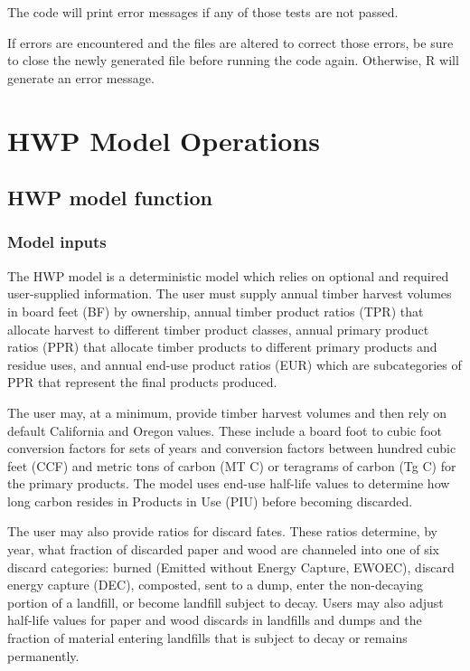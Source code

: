 \documentclass[
  openany]{book}
\begin{document}
The code will print error messages if any of those tests are not passed.

If errors are encountered and the files are altered to correct those
errors, be sure to close the newly generated file before running the
code again. Otherwise, R will generate an error message.

\hypertarget{model}{%
\chapter{HWP Model Operations}\label{model}}

\hypertarget{model-func}{%
\section{HWP model function}\label{model-func}}

\hypertarget{model-func-inp}{%
\subsection{Model inputs}\label{model-func-inp}}

The HWP model is a deterministic model which relies on optional and
required user-supplied information. The user must supply annual timber
harvest volumes in board feet (BF) by ownership, annual timber product
ratios (TPR) that allocate harvest to different timber product classes,
annual primary product ratios (PPR) that allocate timber products to
different primary products and residue uses, and annual end-use product
ratios (EUR) which are subcategories of PPR that represent the final
products produced.

The user may, at a minimum, provide timber harvest volumes and then rely
on default California and Oregon values. These include a board foot to
cubic foot conversion factors for sets of years and conversion factors
between hundred cubic feet (CCF) and metric tons of carbon (MT C) or
teragrams of carbon (Tg C) for the primary products. The model uses
end-use half-life values to determine how long carbon resides in
Products in Use (PIU) before becoming discarded.

The user may also provide ratios for discard fates. These ratios
determine, by year, what fraction of discarded paper and wood are
channeled into one of six discard categories: burned (Emitted without
Energy Capture, EWOEC), discard energy capture (DEC), composted, sent to
a dump, enter the non-decaying portion of a landfill, or become landfill
subject to decay. Users may also adjust half-life values for paper and
wood discards in landfills and dumps and the fraction of material
entering landfills that is subject to decay or remains permanently.
\end{document}
